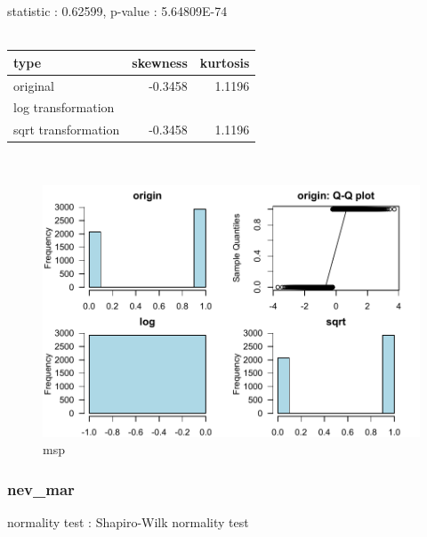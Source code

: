 \documentclass{book}\usepackage[]{graphicx}\usepackage[]{color}
\begin{document}
\noindent statistic : 0.62599,  p-value : 5.64809E-74\\
\\%
\begin{tabular}{lrr}
  \toprule
type & skewness & kurtosis \\ 
  \midrule
original & -0.3458 & 1.1196 \\ 
  log transformation &  &  \\ 
  sqrt transformation & -0.3458 & 1.1196 \\ 
   \bottomrule
\end{tabular}
\\
\begin{figure}[!ht]
\centering
\includegraphics[width=1.0\textwidth]{figure/norm6.pdf}
\caption{msp}
\end{figure}
\clearpage
\subsubsection{ nev\_mar }

normality test : Shapiro-Wilk normality test
\end{document}
